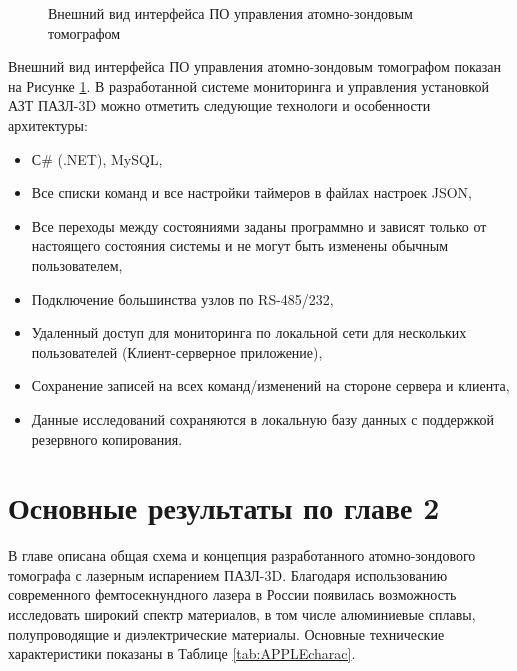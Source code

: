 \begin{figure}[htb]
	\caption{Внешний вид интерфейса ПО управления атомно-зондовым томографом}
	\label{fig:auto_APPLE_Jabber}
\end{figure}

Внешний вид интерфейса ПО управления атомно-зондовым томографом показан на Рисунке \cref{fig:auto_APPLE_Jabber}. В разработанной системе мониторинга и управления установкой АЗТ ПАЗЛ-3D можно отметить следующие  технологи и особенности архитектуры:

\begin{itemize}[beginpenalty=10000]
	\item С$\#$ (.NET), MySQL,
	\item Все списки команд и все настройки таймеров в файлах настроек JSON,
	\item Все переходы между состояниями заданы программно и зависят только от настоящего состояния системы и не могут быть изменены обычным пользователем,
	\item Подключение большинства узлов по RS-485/232,
	\item Удаленный доступ для мониторинга по локальной сети для нескольких пользователей (Клиент-серверное приложение),
	\item Сохранение записей на всех команд/изменений на стороне сервера и клиента,
	\item Данные исследований сохраняются в локальную базу данных с поддержкой резервного копирования.
\end{itemize}


\FloatBarrier
\section{Основные результаты по главе 2}\label{sec:ch2/sec7}

В главе описана общая схема и концепция разработанного атомно-зондового томографа с лазерным испарением ПАЗЛ-3D. Благодаря использованию современного фемтосекнундного лазера в России появилась возможность исследовать широкий спектр материалов, в том числе алюминиевые сплавы, полупроводящие и диэлектрические материалы. Основные технические характеристики показаны в Таблице \cref{tab:APPLEcharac}.

